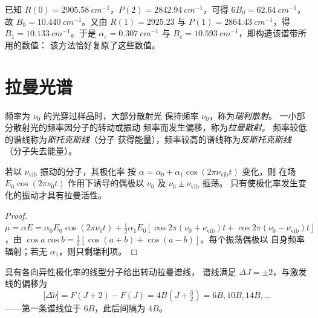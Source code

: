 \begin{example}\label{ex:b3:rovibrational-spectroscopy:analysis}
已知 $R(0) = \qty{2905.58}{cm^{-1}}$，$P(2) = \qty{2842.94}{cm^{-1}}$，可得
$6B_0 = \qty{62.64}{cm^{-1}}$，故 $B_0 = \qty{10.440}{cm^{-1}}$。又由 $R(1) = 2925.23$ 与 $P(1) =
\qty{2864.43}{cm^{-1}}$，得 $B_1 = \qty{10.133}{cm^{-1}}$。于是 $\alpha_e = \qty{0.307}{cm^{-1}}$
与 $B_e = \qty{10.593}{cm^{-1}}$，即构造该谱带所用的数值：
该方法恰好复原了这些数值。
\end{example}

\section{拉曼光谱}

\begin{definition}[拉曼散射与瑞利散射]\label{def:b3:rovibrational-spectroscopy:raman}
频率为 $\nu_0$ 的光穿过样品时，大部分散射光
保持频率 $\nu_0$，称为\emph{瑞利散射}。
一小部分散射光的频率因分子的转动或振动
频率而发生偏移，称为\emph{拉曼散射}。
频率较低的谱线称为\emph{斯托克斯线}（分子
获得能量），频率较高的谱线称为\emph{反斯托克斯线}
（分子失去能量）。
\end{definition}

\begin{proposition}[拉曼效应的经典起源]\label{prop:b3:rovibrational-spectroscopy:raman-classical}
若以 $\nu_{\mathrm{vib}}$ 振动的分子，其极化率
按 $\alpha = \alpha_0 + \alpha_1\cos(2\pi\nu_{\mathrm{vib}}t)$ 变化，则
在场 $E_0\cos(2\pi\nu_0t)$ 作用下诱导的偶极以 $\nu_0$ 及 $\nu_0 \pm \nu_{\mathrm{vib}}$ 振荡。
只有使极化率发生变化的振动才具有拉曼活性。
\end{proposition}

\begin{proof}
$\mu = \alpha E = \alpha_0E_0\cos(2\pi\nu_0t) + \frac12\alpha_1E_0[\cos2\pi(\nu_0 +
\nu_{\mathrm{vib}})t + \cos2\pi(\nu_0 - \nu_{\mathrm{vib}})t]$，由 $\cos a\cos b =
\frac12[\cos(a+b) + \cos(a-b)]$。每个振荡偶极以
自身频率辐射；若无 $\alpha_1$，则只剩瑞利项。
\end{proof}

\begin{proposition}[转动拉曼谱线]\label{prop:b3:rovibrational-spectroscopy:rotational-raman}
具有各向异性极化率的线型分子给出转动拉曼谱线，
谱线满足 $\Delta J = \pm2$，与激发线的偏移为
\[
|\Delta\tilde\nu| = F(J+2) - F(J) = 4B(J + \tfrac32) = 6B, 10B, 14B, \dots
\]
——第一条谱线位于 $6B$，此后间隔为 $4B$。
\end{proposition}

